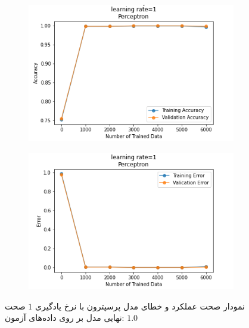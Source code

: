\documentclass[12pt, a4paper]{article}
\begin{document}
\begin{figure}[h]
    \begin{subfigure}{0.45\linewidth}
        \centering
        \includegraphics[width=\linewidth]{images/3/perceptron/lr/acc_1.png}
    \end{subfigure}
    \hfil
    \begin{subfigure}{0.45\linewidth}
        \centering
        \includegraphics[width=\linewidth]{images/3/perceptron/lr/error_1.png}
    \end{subfigure}
    \caption{نمودار صحت عملکرد‌ و خطای مدل پرسپترون با نرخ یادگیری $1$
    \newline
    صحت نهایی مدل بر روی داده‌های آزمون: $1.0$}
\end{figure}
\end{document}
